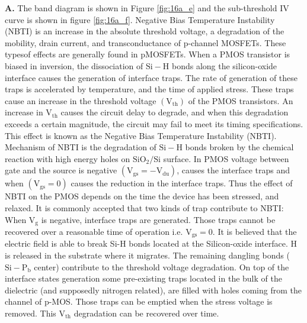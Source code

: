 \documentclass[main.tex]{subfiles}
\begin{document}
\begin{enumerate}
\begin{enumerate}
        \textbf{A.} The band diagram is shown in Figure \ref{fig:16a_e} and the sub-threshold IV curve is shown in figure \ref{fig:16a_f}. Negative Bias Temperature Instability (NBTI) is an increase in the absolute threshold voltage, a degradation of the mobility, drain current, and transconductance of p-channel MOSFETs. These typesof effects are generally found in pMOSFETs. When a PMOS transistor is biased in inversion, the dissociation of $\mathrm{Si}-\mathrm{H}$ bonds along the silicon-oxide interface causes the generation of interface traps. The rate of generation of these traps is accelerated by temperature, and the time of applied stress. These traps cause an increase in the threshold voltage $\left(\mathrm{V}_{\mathrm{th}}\right)$ of the PMOS transistors. An increase in $\mathrm{V}_{\mathrm{th}}$ causes the circuit delay to degrade, and when this degradation exceeds a certain magnitude, the circuit may fail to meet its timing specifications. This effect is known as the Negative Bias Temperature Instability (NBTI). Mechanism of NBTI is the degradation of $\mathrm{Si}-\mathrm{H}$ bonds broken by the chemical reaction with high energy holes on $\mathrm{SiO}_2 / \mathrm{Si}$ surface. In PMOS voltage between gate and the source is negative $\left(\mathrm{V}_{\mathrm{gs}}=-\mathrm{V}_{\mathrm{du}}\right)$, causes the interface traps and when $\left(\mathrm{V}_{\mathrm{gs}}=0\right)$ causes the reduction in the interface traps. Thus the effect of NBTI on the PMOS depends on the time the device has been stressed, and relaxed. It is commonly accepted that two kinds of trap contribute to NBTI: When $\mathrm{V}_{\mathrm{g}}$ is negative, interface traps are generated. Those traps cannot be recovered over a reasonable time of operation i.e. $\mathrm{V}_{\mathrm{gs}}=0$. It is believed that the electric field is able to break Si-H bonds located at the Silicon-oxide interface. $\mathrm{H}$ is released in the substrate where it migrates. The remaining dangling bonds ( $\mathrm{Si}-\mathrm{P}_{\mathrm{b}}$ center) contribute to the threshold voltage degradation. On top of the interface states generation some pre-existing traps located in the bulk of the dielectric (and supposedly nitrogen related), are filled with holes coming from the channel of p-MOS. Those traps can be emptied when the stress voltage is removed. This $\mathrm{V}_{\mathrm{th}}$ degradation can be recovered over time.


\end{enumerate}
\end{enumerate}
\end{document}
